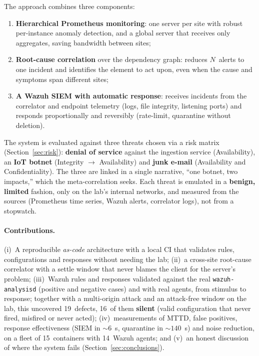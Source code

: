\documentclass[11pt,a4paper]{article}
\begin{document}
The approach combines three components:

\begin{enumerate}
  \item \textbf{Hierarchical Prometheus monitoring}: one server per site with robust
    per-instance anomaly detection, and a global server that receives only aggregates,
    saving bandwidth between sites;
  \item \textbf{Root-cause correlation} over the dependency graph: reduces $N$~alerts to one
    incident and identifies the element to act upon, even when the cause and symptoms span
    different sites;
  \item \textbf{A Wazuh SIEM with automatic response}: receives incidents from the correlator
    and endpoint telemetry (logs, file integrity, listening ports) and responds proportionally
    and reversibly (rate-limit, quarantine without deletion).
\end{enumerate}

The system is evaluated against three threats chosen via a risk matrix (Section~\ref{sec:risk}):
\textbf{denial of service} against the ingestion service (Availability), an \textbf{IoT
botnet} (Integrity $\to$ Availability) and \textbf{junk e-mail} (Availability and
Confidentiality). The three are linked in a single narrative, ``one botnet, two impacts,''
which the meta-correlation seeks. Each threat is emulated in a \textbf{benign, limited}
fashion, only on the lab's internal networks, and measured from the sources (Prometheus time
series, Wazuh alerts, correlator logs), not from a stopwatch.

\paragraph{Contributions.}
(i)~A reproducible \emph{as-code} architecture with a local CI that validates rules,
configurations and responses without needing the lab;
(ii)~a cross-site root-cause correlator with a settle window that never blames the client
for the server's problem;
(iii)~Wazuh rules and responses validated against the real \texttt{wazuh-analysisd} (positive
and negative cases) and with real agents, from stimulus to response; together with a multi-origin attack and an
attack-free window on the lab, this uncovered 19~defects, 16~of them \textbf{silent} (valid
configuration that never fired, misfired or never acted);
(iv)~measurements of MTTD, false positives, response effectiveness (SIEM in ${\sim}6$~s,
quarantine in ${\sim}140$~s) and noise reduction, on a fleet of 15~containers with 14~Wazuh
agents; and
(v)~an honest discussion of where the system fails (Section~\ref{sec:conclusions}).
\end{document}
